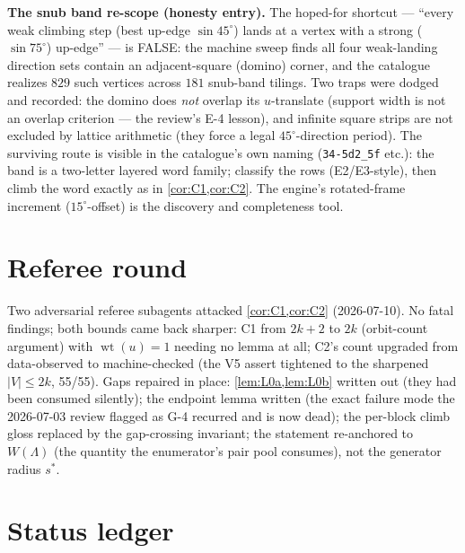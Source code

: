 \documentclass[11pt,a4paper,oneside]{article}
\theoremstyle{plain}
\theoremstyle{remark}
\DeclareMathOperator{\wt}{wt}
\begin{document}
\smallskip
\noindent\textbf{The snub band re-scope (honesty entry).} The hoped-for shortcut ---
``every weak climbing step (best up-edge $\sin 45^\circ$) lands at a vertex with a strong
($\sin 75^\circ$) up-edge'' --- is FALSE: the machine sweep finds all four weak-landing
direction sets contain an adjacent-square (domino) corner, and the catalogue realizes
$829$ such vertices across $181$ snub-band tilings. Two traps were dodged and recorded:
the domino does \emph{not} overlap its $u$-translate (support width is not an overlap
criterion --- the review's E-4 lesson), and infinite square strips are not excluded by
lattice arithmetic (they force a legal $45^\circ$-direction period). The surviving route
is visible in the catalogue's own naming (\texttt{34-5d2\_5f} etc.): the band is a
two-letter layered word family; classify the rows (E2/E3-style), then climb the word
exactly as in \cref{cor:C1,cor:C2}. The engine's rotated-frame increment
($15^\circ$-offset) is the discovery and completeness tool.

\section{Referee round}\label{sec:referee}

Two adversarial referee subagents attacked \cref{cor:C1,cor:C2} (2026-07-10). No fatal
findings; both bounds came back sharper: C1 from $2k{+}2$ to $2k$ (orbit-count argument)
with $\wt(u) = 1$ needing no lemma at all; C2's count upgraded from data-observed to
machine-checked (the V5 assert tightened to the sharpened $|V| \le 2k$, 55/55). Gaps
repaired in place: \cref{lem:L0a,lem:L0b} written out (they had been consumed silently);
the endpoint lemma written (the exact failure mode the 2026-07-03 review flagged as G-4
recurred and is now dead); the per-block climb gloss replaced by the gap-crossing
invariant; the statement re-anchored to $W(\Lambda)$ (the quantity the enumerator's pair
pool consumes), not the generator radius $s^*$.

\section{Status ledger}\label{sec:ledger}
\end{document}
